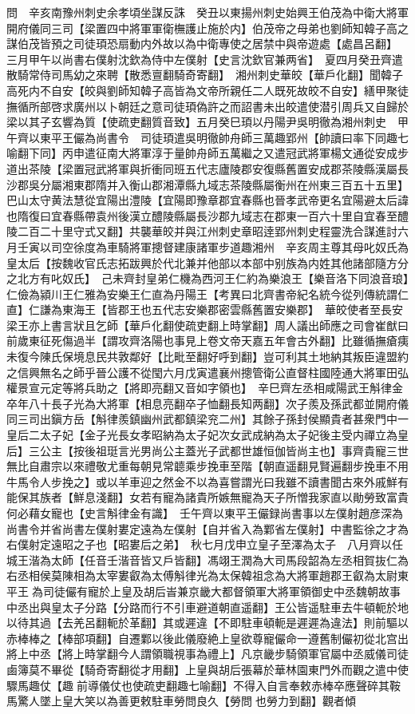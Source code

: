 問　辛亥南豫州刺史余孝頃坐謀反誅　癸丑以東揚州刺史始興王伯茂為中衛大將軍開府儀同三司【梁置四中將軍軍衛橅護止施於内】伯茂帝之母弟也劉師知韓子高之謀伯茂皆預之司徒頊恐扇動内外故以為中衛專使之居禁中與帝遊處【處昌呂翻】　三月甲午以尚書右僕射沈欽為侍中左僕射【史言沈欽官兼两省】　夏四月癸丑齊遣散騎常侍司馬幼之來聘【散悉亶翻騎奇寄翻】　湘州刺史華皎【華戶化翻】聞韓子高死内不自安【皎與劉師知韓子高皆為文帝所親任二人既死故皎不自安】繕甲聚徒撫循所部啓求廣州以卜朝廷之意司徒頊偽許之而詔書未出皎遣使潜引周兵又自歸於梁以其子玄響為質【使疏吏翻質音致】五月癸巳頊以丹陽尹吳明徹為湘州刺史　甲午齊以東平王儼為尚書令　司徒頊遣吳明徹帥舟師三萬趣郢州【帥讀曰率下同趣七喻翻下同】丙申遣征南大將軍淳于量帥舟師五萬繼之又遣冠武將軍楊文通從安成步道出茶陵【梁置冠武將軍與折衝同班五代志廬陵郡安復縣舊置安成郡茶陵縣漢屬長沙郡吳分屬湘東郡隋并入衡山郡湘潭縣九域志茶陵縣屬衡州在州東三百五十五里】巴山太守黄法慧從宜陽出澧陵【宜陽即豫章郡宜春縣也晉孝武帝更名宜陽避太后諱也隋復曰宜春縣帶袁州後漢立醴陵縣屬長沙郡九域志在郡東一百六十里自宜春至醴陵二百二十里守式又翻】共襲華皎并與江州刺史章昭逹郢州刺史程靈洗合謀進討六月壬寅以司空徐度為車騎將軍摠督建康諸軍步道趣湘州　辛亥周主尊其母叱奴氏為皇太后【按魏收官氏志拓跋興於代北兼并他部以本部中别族為内姓其他諸部隨方分之北方有叱奴氏】　己未齊封皇弟仁機為西河王仁約為樂浪王【樂音洛下同浪音琅】仁儉為潁川王仁雅為安樂王仁直為丹陽王【考異曰北齊書帝紀名統今從列傳統謂仁直】仁謙為東海王【皆郡王也五代志安樂郡密雲縣舊置安樂郡】　華皎使者至長安梁王亦上書言狀且乞師【華戶化翻使疏吏翻上時掌翻】周人議出師應之司會崔猷曰前歲東征死傷過半【謂攻齊洛陽也事見上卷文帝天嘉五年會古外翻】比雖循撫瘡痍未復今陳氏保境息民共敦鄰好【比毗至翻好呼到翻】豈可利其土地納其叛臣違盟約之信興無名之師乎晉公護不從閠六月戊寅遣襄州摠管衛公直督柱國陸通大將軍田弘權景宣元定等將兵助之【將即亮翻又音如字領也】　辛巳齊左丞相咸陽武王斛律金卒年八十長子光為大將軍【相息亮翻卒子恤翻長知两翻】次子羨及孫武都並開府儀同三司出鎭方岳【斛律羨鎮幽州武都鎮梁兖二州】其餘子孫封侯顯貴者甚衆門中一皇后二太子妃【金子光長女孝昭納為太子妃次女武成納為太子妃後主受内禪立為皇后】三公主【按後祖珽言光男尚公主蓋光子武都世雄恒伽皆尚主也】事齊貴寵三世無比自肅宗以來禮敬尤重每朝見常聼乘步挽車至階【朝直遥翻見賢遍翻步挽車不用牛馬令人步挽之】或以羊車迎之然金不以為喜嘗謂光曰我雖不讀書聞古來外戚鮮有能保其族者【鮮息淺翻】女若有寵為諸貴所嫉無寵為天子所憎我家直以勛勞致富貴何必藉女寵也【史言斛律金有識】　壬午齊以東平王儼録尚書事以左僕射趙彦深為尚書令并省尚書左僕射婁定遠為左僕射【自并省入為鄴省左僕射】中書監徐之才為右僕射定遠昭之子也【昭婁后之弟】　秋七月戊申立皇子至澤為太子　八月齊以任城王湝為太師【任音壬湝音皆又戶皆翻】馮翊王潤為大司馬段韶為左丞相賀抜仁為右丞相侯莫陳相為太宰婁叡為太傅斛律光為太保韓祖念為大將軍趙郡王叡為太尉東平王為司徒儼有寵於上皇及胡后峕兼京畿大都督領軍大將軍領御史中丞魏朝故事中丞出與皇太子分路【分路而行不引車避道朝直遥翻】王公皆遥駐車去牛頓軛於地以待其過【去羌呂翻軛於革翻】其或遲違【不即駐車頓軛是遲遲為違法】則前驅以赤棒棒之【棒部項翻】自遷鄴以後此儀廢絶上皇欲尊寵儼命一遵舊制儼初從北宫出將上中丞【將上時掌翻今人謂領職視事為禮上】凡京畿步騎領軍官屬中丞威儀司徒鹵簿莫不畢從【騎奇寄翻從才用翻】上皇與胡后張幕於華林園東門外而觀之遣中使驟馬趣仗【趣前導儀仗也使疏吏翻趣七喻翻】不得入自言奉敕赤棒卒應聲碎其鞍馬驚人墜上皇大笑以為善更敕駐車勞問良久【勞問也勞力到翻】觀者傾